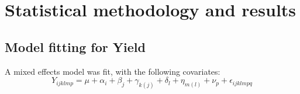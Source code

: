 \section*{Statistical methodology and results} \label{Sec_Methods}

\subsection*{Model fitting for Yield}
A mixed effects model was fit, with the following covariates:
\[ Y_{ijklmp} = \mu + \alpha_i + \beta_j + \gamma_{k(j)} + \delta_l + \eta_{m(l)} + \nu_p + \epsilon_{ijklmpq} \]

